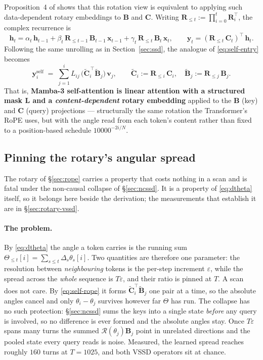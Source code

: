 \documentclass[11pt,a4paper]{article}
\begin{document}
Proposition~4 of \cite{mamba3} shows that this rotation view is equivalent
to applying such data-dependent rotary embeddings to $\bm{B}$ and $\bm{C}$.
Writing $\bm{R}_{\le t} := \prod_{i=0}^{t}\bm{R}_i^\top$, the complex
recurrence is
\begin{equation}\label{eq:complex-rec}
  \bm{h}_t = \alpha_t\,\bm{h}_{t-1}
            + \beta_t\,\bm{R}_{\le t-1}\,\bm{B}_{t-1}\,\bm{x}_{t-1}
            + \gamma_t\,\bm{R}_{\le t}\,\bm{B}_{t}\,\bm{x}_{t},
\qquad
  \bm{y}_t = (\bm{R}_{\le t}\,\bm{C}_t)^\top\,\bm{h}_t.
\end{equation}
Following the same unrolling as in Section~\ref{sec:ssd}, the
analogue of \eqref{eq:self-entry} becomes
\begin{equation}\label{eq:self-rope}
  \bm{y}_i^{\text{self}}
     \;=\; \sum_{j=1}^{i} L_{ij}\,
            \bigl(\widetilde{\bm{C}}_i^{\,\top}\widetilde{\bm{B}}_j\bigr)\,\bm{v}_j,
  \qquad
  \widetilde{\bm{C}}_i := \bm{R}_{\le i}\,\bm{C}_i,\quad
  \widetilde{\bm{B}}_j := \bm{R}_{\le j}\,\bm{B}_j.
\end{equation}
That is, \textbf{Mamba-3 self-attention is linear attention with a
structured mask $\bm{L}$ and a \emph{content-dependent} rotary embedding}
applied to the $\bm{B}$ (key) and $\bm{C}$ (query) projections ---
structurally the same rotation the Transformer's RoPE uses, but with the
angle read from each token's content rather than fixed to a position-based
schedule $10000^{-2i/N}$.

\subsection{Pinning the rotary's angular spread}
\label{sec:rope-turns}

The rotary of \S\ref{sec:rope} carries a property that costs nothing in a scan and is
fatal under the non-causal collapse of \S\ref{sec:ncssd}. It is a property of
\eqref{eq:dtheta} itself, so it belongs here beside the derivation; the measurements that
establish it are in \S\ref{sec:rotary-vssd}.

\paragraph{The problem.}
By \eqref{eq:dtheta} the angle a token carries is the running sum
$\Theta_{\le t}[i]=\sum_{s\le t}\Delta_s\theta_s[i]$. Two quantities are therefore one
parameter: the resolution between \emph{neighbouring} tokens is the per-step increment
$\varepsilon$, while the spread across the \emph{whole} sequence is $T\varepsilon$, and
their ratio is pinned at $T$. A scan does not care. By \eqref{eq:self-rope} it forms
$\widetilde{\bm{C}}_i^{\top}\widetilde{\bm{B}}_j$ one pair at a time, so the absolute
angles cancel and only $\theta_i-\theta_j$ survives however far $\Theta$ has run. The
collapse has no such protection: \S\ref{sec:ncssd} sums the keys into a single state
\emph{before} any query is involved, so no difference is ever formed and the absolute
angles stay. Once $T\varepsilon$ spans many turns the summed
$\mathcal{R}(\theta_j)\bm{B}_j$ point in unrelated directions and the pooled state every
query reads is noise. Measured, the learned spread reaches roughly $160$ turns at
$T{=}1025$, and both VSSD operators sit at chance.
\end{document}
